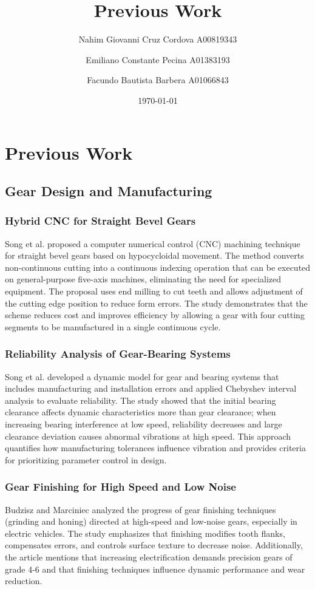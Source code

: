 \documentclass{article}
\title{Previous Work}
\author{
    Nahim Giovanni Cruz Cordova A00819343 \and
    Emiliano Constante Pecina A01383193 \and
    Facundo Bautista Barbera A01066843
}
\date{\today}
\begin{document}
\maketitle

\section*{Previous Work}

\subsection*{Gear Design and Manufacturing}

\subsubsection*{Hybrid CNC for Straight Bevel Gears}
Song et al. \cite{song2025cnc} proposed a computer numerical control (CNC) machining technique for straight bevel gears based on hypocycloidal movement.
The method converts non-continuous cutting into a continuous indexing operation that can be executed on general-purpose five-axis machines, eliminating the need for specialized equipment.
The proposal uses end milling to cut teeth and allows adjustment of the cutting edge position to reduce form errors.
The study demonstrates that the scheme reduces cost and improves efficiency by allowing a gear with four cutting segments to be manufactured in a single continuous cycle.

\subsubsection*{Reliability Analysis of Gear-Bearing Systems}
Song et al. \cite{song2025reliability} developed a dynamic model for gear and bearing systems that includes manufacturing and installation errors and applied Chebyshev interval analysis to evaluate reliability.
The study showed that the initial bearing clearance affects dynamic characteristics more than gear clearance; when increasing bearing interference at low speed, reliability decreases and large clearance deviation causes abnormal vibrations at high speed.
This approach quantifies how manufacturing tolerances influence vibration and provides criteria for prioritizing parameter control in design.

\subsubsection*{Gear Finishing for High Speed and Low Noise}
Budzisz and Marciniec \cite{budzisz2022finishing} analyzed the progress of gear finishing techniques (grinding and honing) directed at high-speed and low-noise gears, especially in electric vehicles.
The study emphasizes that finishing modifies tooth flanks, compensates errors, and controls surface texture to decrease noise.
Additionally, the article mentions that increasing electrification demands precision gears of grade 4-6 and that finishing techniques influence dynamic performance and wear reduction.
\end{document}
